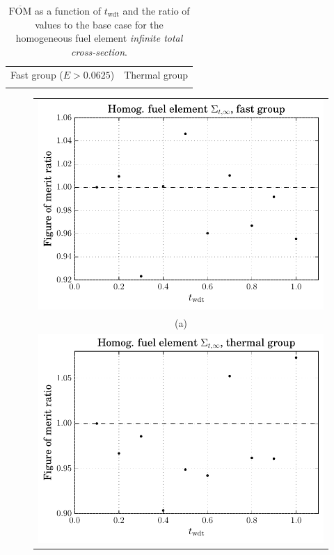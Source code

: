 \begin{table}[hbtp]
  \centering
  \caption[$\overline{\mathrm{FOM}}$ and ratio for
    the homogeneous fuel element \textit{infinite total cross-section}.]{$\overline{\mathrm{FOM}}$ as a function of
    $t_{\mathrm{wdt}}$ and the ratio of values to the base case for
    the homogeneous fuel element \textit{infinite total cross-section}.}
  \begin{tabular}{cc} Fast group ($E > 0.0625$) & Thermal group \\
    
 &
   
  \end{tabular}
\label{tab:homog_inf_tot}
\end{table}
\begin{figure}[hbtp]
  \centering
  \begin{tabular}{c}
  \includegraphics[scale=0.9]{images/results/homog_inf_tot_grp_comb1} \\
    (a) \\
  \includegraphics[scale=0.9]{images/results/homog_inf_tot_grp_comb2} \\

\end{tabular}
\end{figure}
